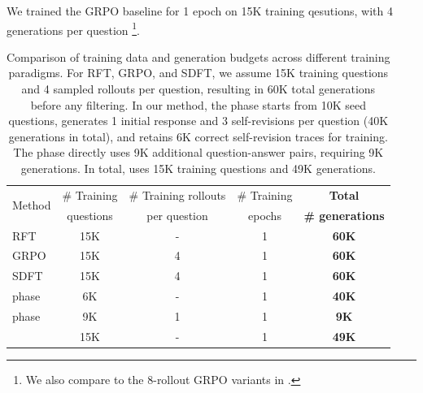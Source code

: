 We trained the GRPO baseline for 1 epoch on 15K training qesutions, with 4 generations per question \footnote{We also compare to the 8-rollout GRPO variants in .}.
\begin{table}[h]
\centering
\small
\begin{tabular}{lcccc}
\toprule
\multirow{2}{*}{Method} & \# Training & \# Training rollouts & \# Training & \textbf{Total} \\
 & questions & per question & epochs & \textbf{\# generations} \\
\midrule
RFT & 15K & - & 1 & \textbf{60K} \\
GRPO & 15K & 4 & 1 & \textbf{60K} \\
SDFT & 15K & 4 & 1 & \textbf{60K} \\
\midrule
\sft{} phase & 6K & - & 1 & \textbf{40K} \\
\opsd{} phase & 9K & 1 & 1 & \textbf{9K} \\
\textbf{\ours{}} & 15K & - & 1 & \textbf{49K} \\
\bottomrule
\end{tabular}
\caption{Comparison of training data and generation budgets across different training paradigms. For RFT, GRPO, and SDFT, we assume 15K training questions and 4 sampled rollouts per question, resulting in 60K total generations before any filtering. In our method, the \sft{} phase starts from 10K seed questions, generates 1 initial response and 3 self-revisions per question (40K generations in total), and retains 6K correct self-revision traces for training. The \opsd{} phase directly uses 9K additional question-answer pairs, requiring 9K generations. In total, \ours{} uses 15K training questions and 49K generations.}
\label{tab:budget-comparison}
\end{table}






